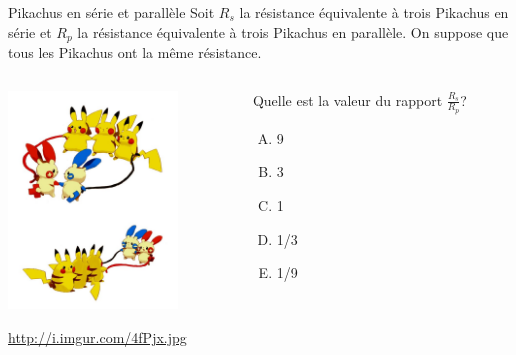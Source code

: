 \documentclass{beamer}
\begin{document}
\begin{frame}{Pikachus en série et parallèle}
  Soit $R_{s}$ la résistance équivalente à trois Pikachus en série et $R_p$ la
  résistance équivalente à trois Pikachus en parallèle. On suppose que tous les
  Pikachus ont la même résistance.

  \begin{columns}
    \begin{column}{0.45\textwidth}
      \begin{center}
        \includegraphics[width=4.5cm]{figures/series-parallel-pikachu.jpg}
      \end{center}
      \begin{flushright}
        {\tiny \url{http://i.imgur.com/4fPjx.jpg} }
      \end{flushright}
    \end{column}

    \begin{column}{0.55\textwidth}
      Quelle est la valeur du rapport $\frac{R_s}{R_p}$?

      \begin{enumerate}[A.]
        \item 9
        \item 3
        \item 1
        \item 1/3
        \item 1/9
      \end{enumerate}
    \end{column}
  \end{columns}
\end{frame}
\end{document}
